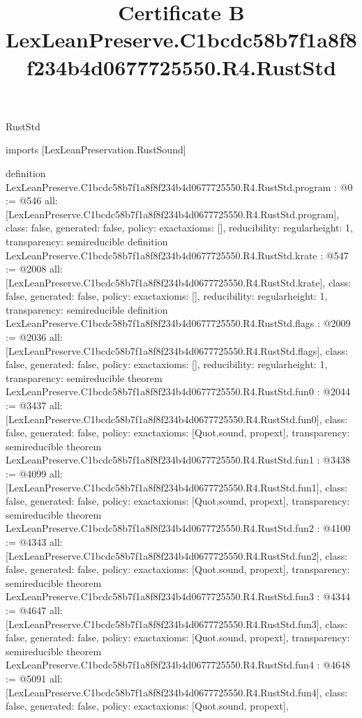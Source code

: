 \begin{lexlean}{RustStd}
\title{Certificate B LexLeanPreserve.C1bcdc58b7f1a8f8f234b4d0677725550.R4.RustStd}
\begin{coremodule}
imports [LexLeanPreservation.RustSound]

definition LexLeanPreserve.C1bcdc58b7f1a8f8f234b4d0677725550.R4.RustStd.program : @0 := @546 {
  all: [LexLeanPreserve.C1bcdc58b7f1a8f8f234b4d0677725550.R4.RustStd.program],
  class: false,
  generated: false,
  policy: exact{axioms: []},
  reducibility: regular{height: 1},
  transparency: semireducible
}
definition LexLeanPreserve.C1bcdc58b7f1a8f8f234b4d0677725550.R4.RustStd.krate : @547 := @2008 {
  all: [LexLeanPreserve.C1bcdc58b7f1a8f8f234b4d0677725550.R4.RustStd.krate],
  class: false,
  generated: false,
  policy: exact{axioms: []},
  reducibility: regular{height: 1},
  transparency: semireducible
}
definition LexLeanPreserve.C1bcdc58b7f1a8f8f234b4d0677725550.R4.RustStd.flags : @2009 := @2036 {
  all: [LexLeanPreserve.C1bcdc58b7f1a8f8f234b4d0677725550.R4.RustStd.flags],
  class: false,
  generated: false,
  policy: exact{axioms: []},
  reducibility: regular{height: 1},
  transparency: semireducible
}
theorem LexLeanPreserve.C1bcdc58b7f1a8f8f234b4d0677725550.R4.RustStd.fun0 : @2044 := @3437 {
  all: [LexLeanPreserve.C1bcdc58b7f1a8f8f234b4d0677725550.R4.RustStd.fun0],
  class: false,
  generated: false,
  policy: exact{axioms: [Quot.sound, propext]},
  transparency: semireducible
}
theorem LexLeanPreserve.C1bcdc58b7f1a8f8f234b4d0677725550.R4.RustStd.fun1 : @3438 := @4099 {
  all: [LexLeanPreserve.C1bcdc58b7f1a8f8f234b4d0677725550.R4.RustStd.fun1],
  class: false,
  generated: false,
  policy: exact{axioms: [Quot.sound, propext]},
  transparency: semireducible
}
theorem LexLeanPreserve.C1bcdc58b7f1a8f8f234b4d0677725550.R4.RustStd.fun2 : @4100 := @4343 {
  all: [LexLeanPreserve.C1bcdc58b7f1a8f8f234b4d0677725550.R4.RustStd.fun2],
  class: false,
  generated: false,
  policy: exact{axioms: [Quot.sound, propext]},
  transparency: semireducible
}
theorem LexLeanPreserve.C1bcdc58b7f1a8f8f234b4d0677725550.R4.RustStd.fun3 : @4344 := @4647 {
  all: [LexLeanPreserve.C1bcdc58b7f1a8f8f234b4d0677725550.R4.RustStd.fun3],
  class: false,
  generated: false,
  policy: exact{axioms: [Quot.sound, propext]},
  transparency: semireducible
}
theorem LexLeanPreserve.C1bcdc58b7f1a8f8f234b4d0677725550.R4.RustStd.fun4 : @4648 := @5091 {
  all: [LexLeanPreserve.C1bcdc58b7f1a8f8f234b4d0677725550.R4.RustStd.fun4],
  class: false,
  generated: false,
  policy: exact{axioms: [Quot.sound, propext]},
}
\end{coremodule}
\end{lexlean}
